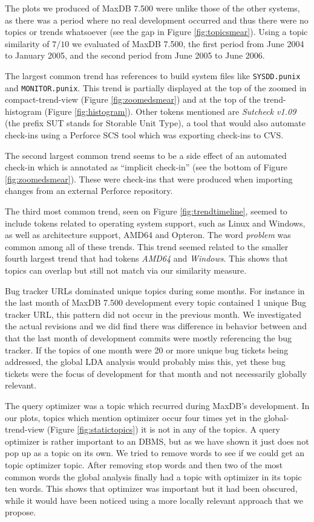 \documentclass[times, 10pt,twocolumn]{article}
\begin{document}
The plots we produced of MaxDB 7.500 were unlike those of the other
systems, as there was a period where no real development occurred and
thus there were no topics or trends whatsoever (see the gap in Figure
\ref{fig:topicsmear}). Using a topic similarity of $7/10$ we evaluated
of MaxDB 7.500, the first period from June 2004 to January 2005, and
the second period from June 2005 to June 2006.

The largest common trend has references to build system files like
\texttt{SYSDD.punix} and \texttt{MONITOR.punix}.  This trend is
partially displayed at the top of the zoomed in compact-trend-view
(Figure \ref{fig:zoomedsmear}) and at the top of the trend-histogram
(Figure \ref{fig:histogram}).  Other tokens mentioned are
\emph{Sutcheck v1.09} (the prefix SUT stands for Storable Unit
Type), a tool that would also automate check-ins using a Perforce SCS tool
which was exporting check-ins to CVS.

The second largest common trend seems to be a side effect of an
automated check-in which is annotated as ``implicit check-in'' (see
the bottom of Figure \ref{fig:zoomedsmear}). These were check-ins that
were produced when importing changes from an external Perforce
repository.

The third most common trend, seen on Figure \ref{fig:trendtimeline},
seemed to include tokens related to operating system support, such as
Linux and Windows, as well as architecture support, AMD64 and
Opteron. The word \emph{problem} was common among all of these
trends. This trend seemed related to the smaller fourth largest trend
that had tokens \emph{AMD64} and \emph{Windows}. This shows that
topics can overlap but still not match via our similarity measure.


Bug tracker URLs dominated unique topics during some months. For
instance in the last month of MaxDB 7.500 development every topic
contained 1 unique Bug tracker URL, this pattern did not occur in the
previous month. We investigated the actual revisions and we did find
there was difference in behavior between and that the last month of
development commits were mostly referencing the bug tracker. If the
topics of one month were 20 or more unique bug tickets being
addressed, the global LDA analysis would probably miss this, yet these
bug tickets were the focus of development for that month and not
necessarily globally relevant.

The query optimizer was a topic which recurred during MaxDB's
development. In our plots, topics which mention optimizer occur four
times yet in the global-trend-view (Figure \ref{fig:statictopics}) it
is not in any of the topics. A query optimizer is rather important to
an DBMS, but as we have shown it just does not pop up as a topic on
its own. We tried to remove words to see if we could get an topic
optimizer topic. After removing stop words and then two of the most
common words the global analysis finally had a topic with optimizer in
its topic ten words. This shows that optimizer was important but it
had been obscured, while it would have been noticed using a more
locally relevant approach that we propose.
\end{document}

